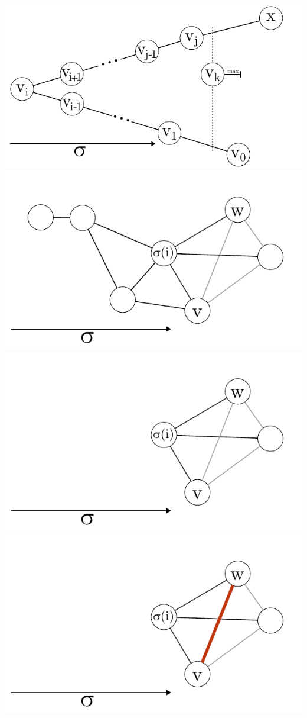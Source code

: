 \documentclass[xcolor=x11names,compress]{beamer}
\begin{document}
\begin{frame}
\begin{center}
\begin{overprint}
			\includegraphics[scale=1.0]{img/graph/q/01-11.pdf}
			\onslide<16>\includegraphics[scale=1.0]{img/graph/q/02-01.pdf}
			\onslide<17>\includegraphics[scale=1.0]{img/graph/q/02-02.pdf}
			\onslide<18>\includegraphics[scale=1.0]{img/graph/q/02-03.pdf}

\end{overprint}
\end{center}
\end{frame}
\end{document}
